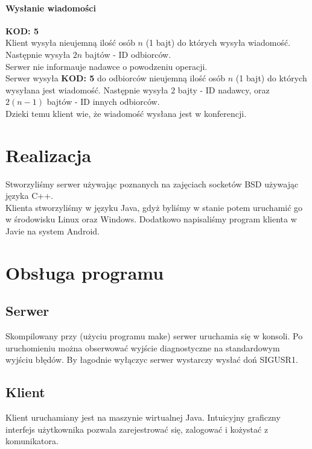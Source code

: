 \documentclass[10pt,a4paper]{article}
\newcommand{\kod}[1]{\textbf{\small{KOD: #1}}}
\begin{document}
	\paragraph{Wysłanie wiadomości}\kod{5}\\
		Klient wysyła nieujemną ilość osób $n$ (1 bajt) do których wysyła wiadomość. Następnie wysyła $2n$ bajtów -
		ID odbiorców.\\
		Serwer nie informauje nadawce o powodzeniu operacji.\\
		Serwer wysyła \kod{5} do odbiorców nieujemną ilość osób $n$ (1 bajt) do których wysyłana jest wiadomość.
		Następnie wysyła $2$ bajty - ID nadawcy, oraz $2(n-1)$ bajtów - ID innych odbiorców.\\
		Dzieki temu klient wie, że wiadomość wysłana jest w konferencji.
\section{Realizacja}
	Stworzyliśmy serwer używając poznanych na zajęciach socketów BSD używając języka C++.\\
	Klienta stworzyliśmy w języku Java, gdyż byliśmy w stanie potem uruchamić go w środowisku
	Linux oraz Windows. Dodatkowo napisaliśmy program klienta w Javie na system Android.
\section{Obsługa programu}
	\subsection{Serwer}
		Skompilowany przy (użyciu programu make) serwer uruchamia się w konsoli.
		Po uruchomieniu można obserwować wyjście diagnostyczne na standardowym wyjściu błędów.
		By łagodnie wyłączyc serwer wystarczy wysłać doń SIGUSR1.
	\subsection{Klient}
		Klient uruchamiany jest na maszynie wirtualnej Java.
		Intuicyjny graficzny interfejs użytkownika pozwala zarejestrować się, zalogować i kożystać z komunikatora.
\end{document}
